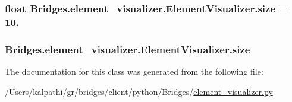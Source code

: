 \subsubsection[{size}]{\setlength{\rightskip}{0pt plus 5cm}float Bridges.\+element\+\_\+visualizer.\+Element\+Visualizer.\+size = 10.\hspace{0.3cm}{\ttfamily [static]}}\label{class_bridges_1_1element__visualizer_1_1_element_visualizer_a310edf0712e14c6d01264ca050166872}
\hypertarget{class_bridges_1_1element__visualizer_1_1_element_visualizer_accfe9e47f83d470165a8bfa8d1ef57c2}{}
\subsubsection[{size}]{\setlength{\rightskip}{0pt plus 5cm}Bridges.\+element\+\_\+visualizer.\+Element\+Visualizer.\+size}\label{class_bridges_1_1element__visualizer_1_1_element_visualizer_accfe9e47f83d470165a8bfa8d1ef57c2}


The documentation for this class was generated from the following file\+:\begin{DoxyCompactItemize}
\item 
/\+Users/kalpathi/gr/bridges/client/python/\+Bridges/\hyperlink{element__visualizer_8py}{element\+\_\+visualizer.\+py}\end{DoxyCompactItemize}

